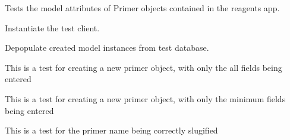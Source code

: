 \documentclass[letterpaper,10pt,english]{sphinxmanual}
\begin{document}

\begin{fulllineitems}
\label{api:experimentdb.reagents.tests.PrimerModelTests}
Tests the model attributes of Primer objects contained in the reagents app.


\begin{fulllineitems}
\label{api:experimentdb.reagents.tests.PrimerModelTests.setUp}
Instantiate the test client.


\end{fulllineitems}


\begin{fulllineitems}
\label{api:experimentdb.reagents.tests.PrimerModelTests.tearDown}
Depopulate created model instances from test database.


\end{fulllineitems}


\begin{fulllineitems}
\label{api:experimentdb.reagents.tests.PrimerModelTests.test_create_primer_all_fields}
This is a test for creating a new primer object, with only the all fields being entered


\end{fulllineitems}


\begin{fulllineitems}
\label{api:experimentdb.reagents.tests.PrimerModelTests.test_create_primer_minimal}
This is a test for creating a new primer object, with only the minimum fields being entered


\end{fulllineitems}


\begin{fulllineitems}
\label{api:experimentdb.reagents.tests.PrimerModelTests.test_primer_slugify}
This is a test for the primer name being correctly slugified


\end{fulllineitems}


\end{fulllineitems}
\end{document}

